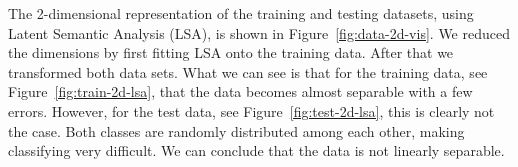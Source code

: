 The 2-dimensional representation of the training and testing datasets, using Latent Semantic Analysis (LSA), is shown in Figure~\ref{fig:data-2d-vis}. We reduced the dimensions by first fitting LSA onto the training data. After that we transformed both data sets. What we can see is that for the training data, see Figure~\ref{fig:train-2d-lsa}, that the data becomes almost separable with a few errors. However, for the test data, see Figure~\ref{fig:test-2d-lsa}, this is clearly not the case. Both classes are randomly distributed among each other, making classifying very difficult. We can conclude that the data is not linearly separable.

\begin{figure}[ht!]
    \centering
    \hfill
        

\end{figure}
